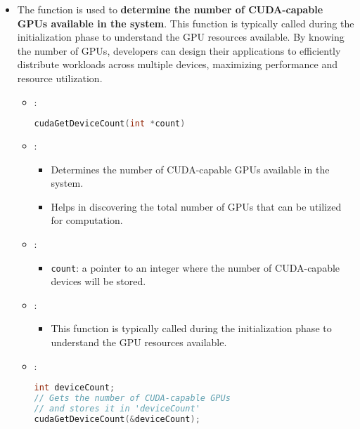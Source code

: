 \begin{itemize}
    \item The  function is used to \textbf{determine the number of CUDA-capable GPUs available in the system}. This function is typically called during the initialization phase to understand the GPU resources available. By knowing the number of GPUs, developers can design their applications to efficiently distribute workloads across multiple devices, maximizing performance and resource utilization.
    \begin{itemize}
        \item {}:
        \begin{lstlisting}[language=C++]
cudaGetDeviceCount(int *count)\end{lstlisting}
        \item {}:
        \begin{itemize}
            \item Determines the number of CUDA-capable GPUs available in the system.
            \item Helps in discovering the total number of GPUs that can be utilized for computation.
        \end{itemize}
        \item {}:
        \begin{itemize}
            \item \texttt{count}: a pointer to an integer where the number of CUDA-capable devices will be stored.
        \end{itemize}
        \newpage
        \item {}:
        \begin{itemize}
            \item This function is typically called during the initialization phase to understand the GPU resources available.
        \end{itemize}
        \item {}:
        \begin{lstlisting}[language=C++]
int deviceCount;
// Gets the number of CUDA-capable GPUs
// and stores it in 'deviceCount'
cudaGetDeviceCount(&deviceCount);\end{lstlisting}
    \end{itemize}
\end{itemize}
